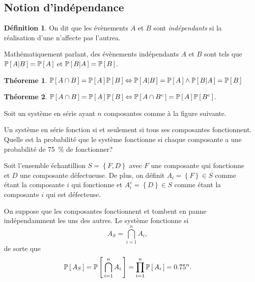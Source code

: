 \documentclass[11pt]{article}
\makeatletter
\renewcommand\P[1]{%
	\ensuremath{%
		\mathbb{P}\left[\,#1\,\right]%
	}%
}%
\newcommand\Pg[2]{%
	\ensuremath{%
		\mathbb{P}\left[\,#1\middle\rvert#2\,\right]%
	}%
}%
\newtheorem{theoreme}{Théoreme}[section]
\theoremstyle{remark}
\theoremstyle{definition}
\newtheorem*{@definition}{Définition}
\newenvironment{definition}{%
	\begin{@definition}%
}{%
	\end{@definition}%
	\setcounter{property}{0}%
}
\makeatother
\begin{document}
\subsection{Notion d'indépendance}
\begin{definition}
	On dit que les évènements $A$ et $B$ sont \textit{indépendants} si la
	réalisation d'une n'affecte pas l'autrea.
\end{definition}

Mathématiquement parlant, des évènements indépendants $A$ et $B$ sont tels que
$\Pg{A}{B}=\P{A}$ et $\Pg{B}{A}=\P{B}$.

\begin{theoreme}
	$\P{A\cap B}=\P{A}\P{B}\Leftrightarrow\Pg{A}{B}=\P{A}\wedge\Pg{B}{A}=\P{B}$
\end{theoreme}

\begin{theoreme}
	$\P{A\cap B}=\P{A}\P{B}\Leftrightarrow\P{A\cap B^c}=\P{A}\P{B^c}$.
\end{theoreme}

\begin{exemple}
	Soit un système en série ayant $n$ composantes comme à la figure suivante.
	\begin{figure}[H]
		\centering
		
	\end{figure}
	Un système en série fonction si et seulement si tous ses composantes
	fonctionnent. Quelle est la probabilité que le système fonctionne si chaque
	composante a une probabilité de \SI{75}{\percent} de fonctionner?

	Soit l'ensemble échantillion $S=\left\{F,D\right\}$ avec $F$ une composante
	qui fonctionne et $D$ une composante défectueuse. De plus, on définit
	$A_i=\left\{F\right\}\in S$ comme étant la composante $i$ qui fonctionne et
	$A_i^c=\left\{D\right\}\in S$ comme étant la composante $i$ qui est
	défecteuse.

	On suppose que les composantes fonctionnent et tombent en panne
	indépendamment les uns des autres. Le système fonctionne si
	\begin{equation*}
		A_S=\bigcap_{i=1}^nA_i,
	\end{equation*}
	de sorte que
	\begin{equation*}
		\P{A_S}
		=\P{\bigcap_{i=1}^nA_i}
		=\prod_{i=1}^n\P{A_i}
		=\SI{0.75}{}^n.
	\end{equation*}
\end{exemple}
\end{document}
